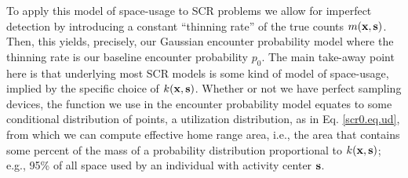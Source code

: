 To apply this model of space-usage to SCR problems we  allow for imperfect
detection by introducing a constant ``thinning rate'' of the true
counts $m({\bf x},{\bf s})$. Then, this
yields, precisely, our Gaussian encounter probability model where the
thinning rate is our baseline encounter probability $p_0$.
The main take-away point here is that underlying most SCR models is
some kind of model of space-usage, implied by the
specific choice of $k({\bf x},{\bf s})$.
Whether or not we have perfect sampling devices, the function we use
in the encounter probability model equates to some conditional
distribution of points, a utilization distribution,
 as in
Eq. \ref{scr0.eq.ud}, from which we can compute effective home range
area, i.e., the area that contains some percent of the mass of a
probability distribution proportional to
 $k({\bf x},{\bf
  s})$; e.g.,  95\% of all space used by an individual with activity
center ${\bf s}$.

